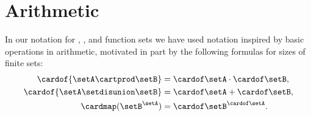 
\section{Arithmetic}
\label{sec:intro-arithmetic}


In our notation for , , and function sets we have used notation inspired by basic operations in arithmetic, motivated in part by the following formulas for sizes of finite sets:
\begin{align}
    \cardof{\setA \cartprod \setB}    & = \cardof \setA \cdot \cardof \setB, \\
    \cardof{\setA \setdisunion \setB} & = \cardof \setA + \cardof \setB, \\
    \cardmap(\setB^{\setA})           & = {\cardof\setB}^{\cardof\setA}.
\end{align}

